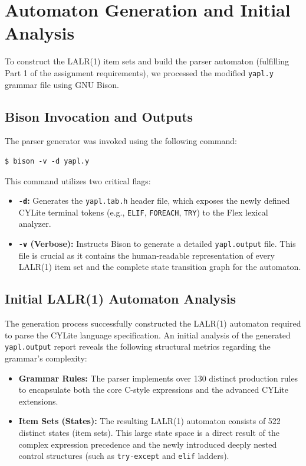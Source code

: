 \documentclass[a4paper,12pt]{article}
\begin{document}
\newpage
\section{Automaton Generation and Initial Analysis}

To construct the LALR(1) item sets and build the parser automaton (fulfilling Part 1 of the assignment requirements), we processed the modified \texttt{yapl.y} grammar file using GNU Bison.

\subsection{Bison Invocation and Outputs}
The parser generator was invoked using the following command:
\begin{lstlisting}
$ bison -v -d yapl.y
\end{lstlisting}

This command utilizes two critical flags:
\begin{itemize}
    \item \textbf{\texttt{-d}:} Generates the \texttt{yapl.tab.h} header file, which exposes the newly defined CYLite terminal tokens (e.g., \texttt{ELIF}, \texttt{FOREACH}, \texttt{TRY}) to the Flex lexical analyzer.
    \item \textbf{\texttt{-v} (Verbose):} Instructs Bison to generate a detailed \texttt{yapl.output} file. This file is crucial as it contains the human-readable representation of every LALR(1) item set and the complete state transition graph for the automaton.
\end{itemize}

\subsection{Initial LALR(1) Automaton Analysis}
The generation process successfully constructed the LALR(1) automaton required to parse the CYLite language specification. An initial analysis of the generated \texttt{yapl.output} report reveals the following structural metrics regarding the grammar's complexity:
\begin{itemize}
    \item \textbf{Grammar Rules:} The parser implements over 130 distinct production rules to encapsulate both the core C-style expressions and the advanced CYLite extensions.
    \item \textbf{Item Sets (States):} The resulting LALR(1) automaton consists of 522 distinct states (item sets). This large state space is a direct result of the complex expression precedence and the newly introduced deeply nested control structures (such as \texttt{try-except} and \texttt{elif} ladders).
\end{itemize}
\end{document}
